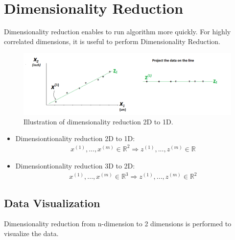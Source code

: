 \documentclass[a4paper,12pt]{report}
\begin{document}
\section{Dimensionality Reduction}
Dimensionality reduction enables to run algorithm more quickly. For highly correlated dimensions, it is useful to perform Dimensionality Reduction.
\begin{figure}[H]
	\centering
        \includegraphics[totalheight=5 cm]{fig5.png}\caption{Illustration of dimensionality reduction 2D to 1D. }
\end{figure}

\begin{itemize}
\item Dimensiontionality reduction 2D to 1D:
\begin{align}
x^{(1)}, ..., x^{(m)} \in \mathbb{R}^2 \Rightarrow z^{(1)}, ..., z^{(m)} \in \mathbb{R}
\end{align}
\item Dimensiontionality reduction 3D to 2D:
\begin{align}
x^{(1)}, ..., x^{(m)} \in \mathbb{R}^3 \Rightarrow z^{(1)}, ..., z^{(m)} \in \mathbb{R}^2
\end{align}
\end{itemize}


\subsection{Data Visualization}
Dimensionality reduction from n-dimension to 2 dimensions is performed to visualize the data. 
\end{document}
